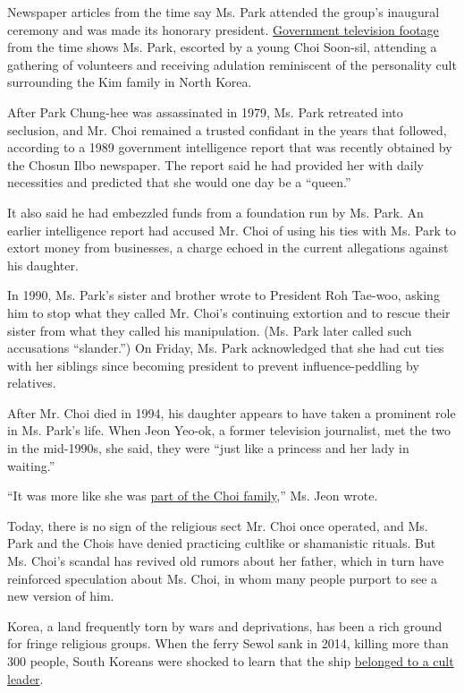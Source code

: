Newspaper articles from the time say Ms. Park attended the group's
inaugural ceremony and was made its honorary president.
\href{http://newstapa.org/35182}{Government television footage} from the
time shows Ms. Park, escorted by a young Choi Soon-sil, attending a
gathering of volunteers and receiving adulation reminiscent of the
personality cult surrounding the Kim family in North Korea.

After Park Chung-hee was assassinated in 1979, Ms. Park retreated into
seclusion, and Mr. Choi remained a trusted confidant in the years that
followed, according to a 1989 government intelligence report that was
recently obtained by the Chosun Ilbo newspaper. The report said he had
provided her with daily necessities and predicted that she would one day
be a ``queen.''

It also said he had embezzled funds from a foundation run by Ms. Park.
An earlier intelligence report had accused Mr. Choi of using his ties
with Ms. Park to extort money from businesses, a charge echoed in the
current allegations against his daughter.

In 1990, Ms. Park's sister and brother wrote to President Roh Tae-woo,
asking him to stop what they called Mr. Choi's continuing extortion and
to rescue their sister from what they called his manipulation. (Ms. Park
later called such accusations ``slander.'') On Friday, Ms. Park
acknowledged that she had cut ties with her siblings since becoming
president to prevent influence-peddling by relatives.

After Mr. Choi died in 1994, his daughter appears to have taken a
prominent role in Ms. Park's life. When Jeon Yeo-ok, a former television
journalist, met the two in the mid-1990s, she said, they were ``just
like a princess and her lady in waiting.''

``It was more like she was
\href{http://news.naver.com/main/read.nhn?mode=LSD\&mid=sec\&oid=023\&aid=0003223740\&sid1=001}{part
of the Choi family},'' Ms. Jeon wrote.

Today, there is no sign of the religious sect Mr. Choi once operated,
and Ms. Park and the Chois have denied practicing cultlike or
shamanistic rituals. But Ms. Choi's scandal has revived old rumors about
her father, which in turn have reinforced speculation about Ms. Choi, in
whom many people purport to see a new version of him.

Korea, a land frequently torn by wars and deprivations, has been a rich
ground for fringe religious groups. When the ferry Sewol sank in 2014,
killing more than 300 people, South Koreans were shocked to learn that
the ship
\href{http://www.nytimes.com/2014/07/27/world/asia/in-ferry-deaths-a-south-korean-tycoons-downfall.html}{belonged
to a cult leader}.

